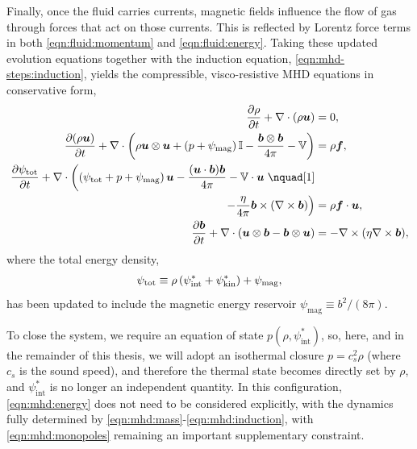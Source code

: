 Finally, once the fluid carries currents, magnetic fields influence the flow of gas through forces that act on those currents. This is reflected by Lorentz force terms in both \autoref{eqn:fluid:momentum} and \autoref{eqn:fluid:energy}. Taking these updated evolution equations together with the induction equation, \autoref{eqn:mhd-steps:induction}, yields the compressible, visco-resistive MHD equations in conservative form,
\begin{align}
    \mppFrac{\rho}{t} + \nabla \cdot (\rho \mVector{u})
        &= 0
        , \label{eqn:mhd:mass} \\
    \mppFrac{(\rho \mVector{u})}{t}
        + \nabla \cdot \rbrac{
            \rho \mVector{u}\otimes\mVector{u}
            + \rbrac{p + \psi_\mathrm{mag}} \mTensor{I}
            - \frac{\mVector{b}\otimes\mVector{b}}{4\pi}
            - \mTensor{V}
        }
        &= \rho \mVector{f}
        , \label{eqn:mhd:momentum} \\
    \mppFrac{\psi_\mathrm{tot}}{t}
        + \nabla \cdot \left(
            \rbrac{\psi_\mathrm{tot} + p + \psi_\mathrm{mag}} \mVector{u}
            - \frac{(\mVector{u}\cdot\mVector{b})\mVector{b}}{4\pi}
            - \mTensor{V}\cdot\mVector{u}
            \right.\nonumber\nquad[1]&\\
            \left.
            - \frac{\eta}{4\pi} \mVector{b}\times(\mCurl{\mVector{b}})
        \right)
        &= \rho \mVector{f} \cdot \mVector{u}
        , \label{eqn:mhd:energy} \\
    \mppFrac{\mVector{b}}{t}
        + \nabla \cdot \rbrac{
            \mVector{u}\otimes\mVector{b} - \mVector{b}\otimes\mVector{u}
        }
        &= -\mCurl{(\eta \mCurl{\mVector{b}})}
        , \label{eqn:mhd:induction}
\end{align}
where the total energy density,
\begin{align}
    \psi_\mathrm{tot}
        \equiv \rho\left( 
                \psi^{*}_\mathrm{int}
                + \psi^{*}_\mathrm{kin}
             \right)
            + \psi_\mathrm{mag}
    ,
\end{align}
has been updated to include the magnetic energy reservoir $\psi_\mathrm{mag} \equiv b^2 / (8\pi)$.

To close the system, we require an equation of state $p(\rho, \psi^{*}_\mathrm{int})$, so, here, and in the remainder of this thesis, we will adopt an isothermal closure $p = c_s^2 \rho$ (where $c_s$ is the sound speed), and therefore the thermal state becomes directly set by $\rho$, and $\psi^{*}_\mathrm{int}$ is no longer an independent quantity. In this configuration, \autoref{eqn:mhd:energy} does not need to be considered explicitly, with the dynamics fully determined by \autoref{eqn:mhd:mass}-\ref{eqn:mhd:induction}, with \autoref{eqn:mhd:monopoles} remaining an important supplementary constraint.

